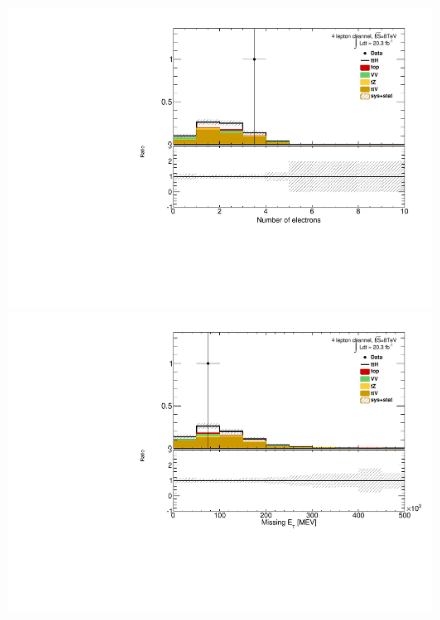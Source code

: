 \begin{figure}[!htbp]
\begin{minipage}[h]{0.5\textwidth}
  \end{minipage}\hfill
  \begin{minipage}[h]{0.5\textwidth}
    \centering \includegraphics[width=\textwidth]{figs/results/plotCand_4lep_NElec}
  \end{minipage}\hfill
  \begin{minipage}[h]{0.5\textwidth}
    \centering \includegraphics[width=\textwidth]{figs/results/plotCand_4lep_MET}
  \end{minipage}\hfill
  \begin{minipage}[h]{0.5\textwidth}

\end{minipage}
\end{figure}
